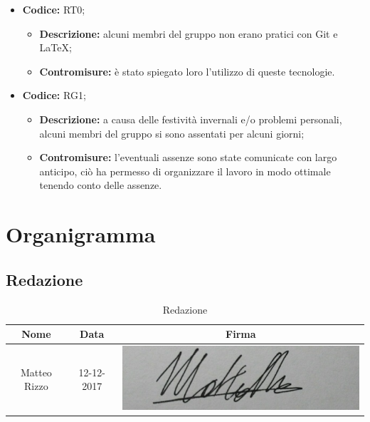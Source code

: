 \documentclass[./PianodiProgetto.tex]{subfiles}
\begin{document}
\begin{itemize}
	\item \textbf{Codice:} RT0;
	\begin{itemize}
		\item \textbf{Descrizione:} alcuni membri del gruppo non erano pratici con Git e \LaTeX;
		\item \textbf{Contromisure:} è stato spiegato loro l'utilizzo di queste tecnologie.
	\end{itemize} 
	\item \textbf{Codice:} RG1;
	\begin{itemize}
		\item \textbf{Descrizione:} a causa delle festività invernali e/o problemi personali, alcuni membri del gruppo si sono assentati per alcuni giorni;
		\item \textbf{Contromisure:} l'eventuali assenze sono state comunicate con largo anticipo, ciò ha permesso di organizzare il lavoro in modo ottimale tenendo conto delle assenze.
	\end{itemize} 
\end{itemize}

\chapter{Organigramma}

\section{Redazione}
\begin{table}[H]
	\centering
	\begin{tabular}{|c|c|c|}
		\hline
		Nome&Data&Firma \\ \hline
		Matteo Rizzo& 12-12-2017 &\includegraphics[scale=0.5]{img/firme/RizzoMatteo} \\
		\hline
	\end{tabular}
	\caption{Redazione}
\end{table}
\end{document}
